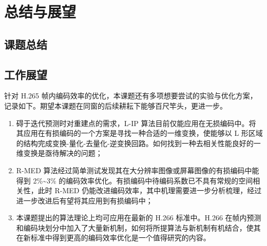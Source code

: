 \chapter{总结与展望}
\label{cha:c5}

\section{课题总结}

\section{工作展望}
针对 H.265 帧内编码效率的优化，本课题还有多项想要尝试的实验与优化方案，记录如下。期望本课题在同窗的后续耕耘下能够百尺竿头，更进一步。
\begin{enumerate}
    \item 碍于迭代预测时对重建点的需求，L-IP 算法目前仅能应用在无损编码中。将其应用在有损编码的一个方案是寻找一种合适的一维变换，使能够以 L 形区域的结构完成变换-量化-去量化-逆变换回路。如何找到一种去相关性能良好的一维变换是亟待解决的问题；
    \item R-MED 算法经过简单测试发现其在大分辨率图像或屏幕图像的有损编码中能得到 2\%\textasciitilde 3\% 的编码效率优化。有损编码中待编码系数已不具有常规的空间相关性，此时 R-MED 仍能改进编码效率，其中机理需要进一步分析梳理，经过进一步改进后有望将其应用到有损编码中；
    \item 本课题提出的算法理论上均可应用在最新的 H.266 标准中。H.266 在帧内预测和编码块划分中加入了大量新机制，如何将所提算法与新机制有机结合，使其在新标准中得到更高的编码效率优化是一个值得研究的内容。
\end{enumerate}
